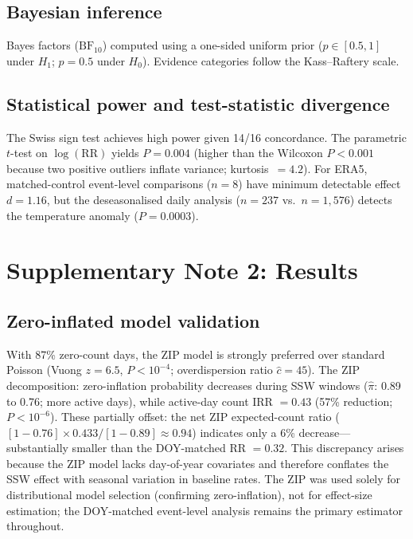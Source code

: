 \documentclass[11pt,letterpaper]{article}
\begin{document}
\subsection{Bayesian inference}

Bayes factors ($\mathrm{BF}_{10}$) computed using a one-sided uniform prior ($p \in [0.5, 1]$ under $H_1$; $p = 0.5$ under $H_0$). Evidence categories follow the Kass--Raftery scale.

\subsection{Statistical power and test-statistic divergence}

The Swiss sign test achieves high power given 14/16 concordance. The parametric $t$-test on $\log(\mathrm{RR})$ yields $P = 0.004$ (higher than the Wilcoxon $P < 0.001$ because two positive outliers inflate variance; kurtosis~$= 4.2$). For ERA5, matched-control event-level comparisons ($n = 8$) have minimum detectable effect $d = 1.16$, but the deseasonalised daily analysis ($n = 237$ vs.\ $n = 1{,}576$) detects the temperature anomaly ($P = 0.0003$).

\section{Supplementary Note 2: Results}

\subsection{Zero-inflated model validation}

With 87\% zero-count days, the ZIP model is strongly preferred over standard Poisson (Vuong $z = 6.5$, $P < 10^{-4}$; overdispersion ratio $\hat{c} = 45$). The ZIP decomposition: zero-inflation probability decreases during SSW windows ($\hat{\pi}$: 0.89 to 0.76; more active days), while active-day count IRR $= 0.43$ (57\% reduction; $P < 10^{-6}$). These partially offset: the net ZIP expected-count ratio ($[1-0.76] \times 0.433 / [1-0.89] \approx 0.94$) indicates only a 6\% decrease---substantially smaller than the DOY-matched RR $= 0.32$. This discrepancy arises because the ZIP model lacks day-of-year covariates and therefore conflates the SSW effect with seasonal variation in baseline rates. The ZIP was used solely for distributional model selection (confirming zero-inflation), not for effect-size estimation; the DOY-matched event-level analysis remains the primary estimator throughout.
\end{document}
